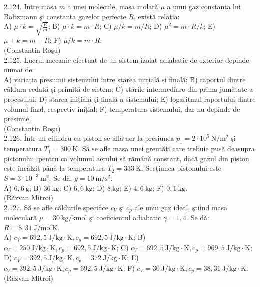 2.124. Intre masa $m$ a unei molecule, masa molară $\mu$ a unui gaz constanta lui Boltzmann şi constanta gazelor perfecte $R$, există relația:\\ A) $\mu \cdot k=\sqrt{\frac{R}{m}}$; В) $\mu \cdot k=m \cdot R$; C) $\mu / k=m / R$; D) $\mu^{2}=m \cdot R / k$; E) $\mu+k=m-R$; F) $\mu / k=m \cdot R$.\\ (Constantin Roşu)\\

2.125. Lucrul mecanic efectuat de un sistem izolat adiabatic de exterior depinde numai de:\\ A) variația presiunii sistemului între starea inițială și finală; B) raportul dintre cāldura cedată şi primită de sistem; C) stările intermediare din prima jumătate a procesului; D) starea inițială şi finală a sistemului; E) logaritmul raportului dintre volumul final, respectiv inițial; F) temperatura sistemului, dar nu depinde de presiune.\\ (Constantin Roşu)\\

2.126. Într-un cilindru cu piston se află aer la presiunea $p_{1}=2 \cdot 10^{5} \mathrm{~N} / \mathrm{m}^{2}$ şi temperatura $T_{1}=300 \mathrm{~K}$. Să se afle masa unei greutăți care trebuie pusă deasupra pistonului, pentru ca volumul aerului să rămână constant, dacă gazul din piston este încălzit până la temperatura $T_{2}=333 \mathrm{~K}$. Secțiunea pistonului este $S=3 \cdot 10^{-3} \mathrm{~m}^{2}$. Se dă: $g=10 \mathrm{~m} / \mathrm{s}^{2}$.\\ A) $6,6 \mathrm{~g}$; B) $36 \mathrm{~kg}$; C) $6,6 \mathrm{~kg}$; D) $8 \mathrm{~kg}$; E) $4,6 \mathrm{~kg}$; F) $0,1 \mathrm{~kg}$.\\ (Răzvan Mitroi)\\

2.127. Să se afle căldurile specifice $c_{V}$ şi $c_{p}$ ale unui gaz ideal, ştiind masa moleculară $\mu=30 \mathrm{~kg} / \mathrm{kmol}$ şi coeficientul adiabatic $\gamma=1,4$. Se dă: $R=8,31 \mathrm{~J} / \mathrm{molK}$.\\ A) $c_{V}=692,5 \mathrm{~J} / \mathrm{kg} \cdot \mathrm{K}, c_{p}=692,5 \mathrm{~J} / \mathrm{kg} \cdot \mathrm{K}$; B) $c_{V}=250 \mathrm{~J} / \mathrm{kg} \cdot \mathrm{K}, c_{p}=692,5 \mathrm{~J} / \mathrm{kg} \cdot \mathrm{K}$; C) $c_{V}=692,5 \mathrm{~J} / \mathrm{kg} \cdot \mathrm{K}, c_{p}=969,5 \mathrm{~J} / \mathrm{kg} \cdot \mathrm{K}$; D) $c_{V}=392,5 \mathrm{~J} / \mathrm{kg} \cdot \mathrm{K}, c_{p}=372 \mathrm{~J} / \mathrm{kg} \cdot \mathrm{K}$; E) $c_{V}=392,5 \mathrm{~J} / \mathrm{kg} \cdot \mathrm{K}, c_{p}=692,5 \mathrm{~J} / \mathrm{kg} \cdot \mathrm{K}$; F) $c_{V}=30 \mathrm{~J} / \mathrm{kg} \cdot \mathrm{K}, c_{p}=38,31 \mathrm{~J} / \mathrm{kg} \cdot \mathrm{K}$.\\ (Răzvan Mitroi)\\

